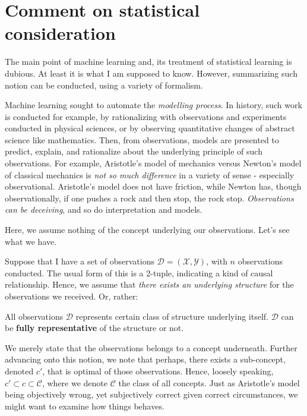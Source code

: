 \documentclass{article}
\begin{document}
\clearpage
\section*{Comment on statistical consideration}
The main point of machine learning and, its treatment of statistical learning is dubious. At least it is what I am supposed to know. However, summarizing such notion can be conducted, using a variety of formalism. 

Machine learning sought to automate the \textit{modelling process}. In history, such work is conducted for example, by rationalizing with observations and experiments conducted in physical sciences, or by observing quantitative changes of abstract science like mathematics. Then, from observations, models are presented to predict, explain, and rationalize about the underlying principle of such observations. For example, Aristotle's model of mechanics versus Newton's model of classical mechanics is \textit{not so much difference} in a variety of sense - especially observational. Aristotle's model does not have friction, while Newton has, though observationally, if one pushes a rock and then stop, the rock stop. \textit{Observations can be deceiving}, and so do interpretation and models. 

Here, we assume nothing of the concept underlying our observations. Let's see what we have. 

Suppose that I have a set of observations $\mathcal{D}=(\mathcal{X},\mathcal{Y})$, with $n$ observations conducted. The usual form of this is a 2-tuple, indicating a kind of causal relationship. Hence, we assume that \textit{there exists an underlying structure} for the observations we received. Or, rather: 
\begin{conjecture}
    All observations $\mathcal{D}$ represents certain class of structure underlying itself. $\mathcal{D}$ can be \textbf{fully representative} of the structure or not. 
\end{conjecture}
We merely state that the observations belongs to a concept underneath. Further advancing onto this notion, we note that perhaps, there exists a sub-concept, denoted $c'$, that is optimal of those observations. Hence, loosely speaking, $c'\subset c\subset \mathcal{C}$, where we denote $\mathcal{C}$ the class of all concepts. Just as Aristotle's model being objectively wrong, yet subjectively correct given correct circumstances, we might want to examine how things behaves. 
\end{document}
